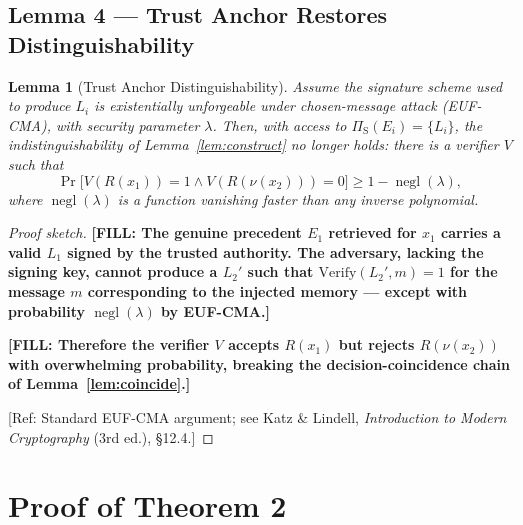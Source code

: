 \documentclass[11pt]{article}
\newcommand{\TODO}[1]{{\color{red}\textbf{[FILL: #1]}}}
\newcommand{\REF}[1]{{\color{teal}\textsf{[Ref: #1]}}}
\theoremstyle{plain}
\newtheorem{lemma}{Lemma}
\theoremstyle{definition}
\DeclareMathOperator{\negl}{negl}
\begin{document}
\subsection{Lemma 4 --- Trust Anchor Restores Distinguishability}

\begin{lemma}[Trust Anchor Distinguishability]\label{lem:anchor}
Assume the signature scheme used to produce $L_i$ is
existentially unforgeable under chosen-message attack (EUF-CMA),
with security parameter $\lambda$.
Then, with access to $\Pi_{\mathrm{S}}(E_i) = \{L_i\}$, the indistinguishability
of Lemma~\ref{lem:construct} no longer holds: there is a verifier
$V$ such that
\[
  \Pr\bigl[V(R(x_1)) = 1 \wedge V(R(\nu(x_2))) = 0\bigr] \ge 1 - \negl(\lambda),
\]
where $\negl(\lambda)$ is a function vanishing faster than any inverse polynomial.
\end{lemma}

\begin{proof}[Proof sketch]
\TODO{The genuine precedent $E_1$ retrieved for $x_1$ carries a valid
$L_1$ signed by the trusted authority. The adversary, lacking the
signing key, cannot produce a $L_2'$ such that $\mathrm{Verify}(L_2', m) = 1$
for the message $m$ corresponding to the injected memory --- except
with probability $\negl(\lambda)$ by EUF-CMA.}

\TODO{Therefore the verifier $V$ accepts $R(x_1)$ but rejects
$R(\nu(x_2))$ with overwhelming probability, breaking the
decision-coincidence chain of Lemma~\ref{lem:coincide}.}

\REF{Standard EUF-CMA argument; see Katz \& Lindell, \textit{Introduction to
Modern Cryptography} (3rd ed.), \S 12.4.}
\end{proof}

\section{Proof of Theorem 2}
\end{document}
